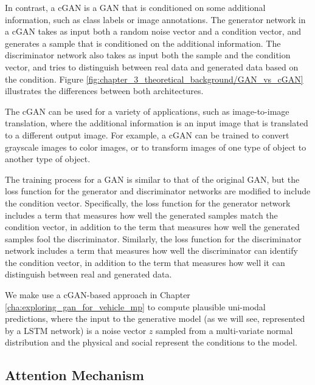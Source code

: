 In contrast, a \ac{cGAN} is a \ac{GAN} that is conditioned on some additional information, such as class labels or image annotations. The generator network in a \ac{cGAN} takes as input both a random noise vector and a condition vector, and generates a sample that is conditioned on the additional information. The discriminator network also takes as input both the sample and the condition vector, and tries to distinguish between real data and generated data based on the condition. Figure \ref{fig:chapter_3_theoretical_background/GAN_vs_cGAN} illustrates the differences between both architectures.

The \ac{cGAN} can be used for a variety of applications, such as image-to-image translation, where the additional information is an input image that is translated to a different output image. For example, a \ac{cGAN} can be trained to convert grayscale images to color images, or to transform images of one type of object to another type of object.

The training process for a \ac{GAN} is similar to that of the original \ac{GAN}, but the loss function for the generator and discriminator networks are modified to include the condition vector. Specifically, the loss function for the generator network includes a term that measures how well the generated samples match the condition vector, in addition to the term that measures how well the generated samples fool the discriminator. Similarly, the loss function for the discriminator network includes a term that measures how well the discriminator can identify the condition vector, in addition to the term that measures how well it can distinguish between real and generated data.

We make use a \ac{cGAN}-based approach in Chapter \ref{cha:exploring_gan_for_vehicle_mp} to compute plausible uni-modal predictions, where the input to the generative model (as we will see, represented by a \ac{LSTM} network) is a noise vector $z$ sampled from a multi-variate normal distribution and the physical and social represent the conditions to the model.


\subsection{Attention Mechanism}
\label{subsec:3_attention}

